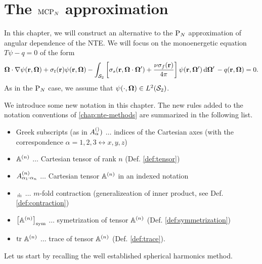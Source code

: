 \ifpdf
	\graphicspath{{4/pic/PNG/}{4/pic/PDF/}{4/pic/}}
\else
	\graphicspath{{4/pic/EPS/}{4/pic/}}
\fi

\chapter{The $\MCPN$ approximation}\label{chap:mcpn}

In this chapter, we will construct an alternative to the $\PN$ approximation of angular dependence of the NTE. We will
focus on the monoenergetic equation $T\psi - q = 0$ of the form
\begin{equation}\label{eq:MC-bte}
    \bomega\cdot\nabla\psi(\br,\bomega) + \sigma_t(\br)\psi(\br,\bomega) - \intA[']{\left[\sigma_s(\br,\bomega\cdot\bomega') + 
    \frac{\nu\sigma_f(\br)}{4\pi}\right]\psi(\br,\bomega')} - q(\br,\bomega) = 0.
\end{equation}
As in the $\PN$ case, we assume that \mbox{$\psi(\cdot,\bomega)\in\Lp[2](\Sphere)$}.

We introduce some new notation in this chapter. The new rules added to the notation conventions of
\cref{chap:nte-methods} are summarized in the following list.

\begin{itemize}
    \item Greek subscripts (as in $\AAA[]{\alpha})$ $\ldots$ indices of the Cartesian axes (with the
    correspondence $\alpha = 1,2,3 \leftrightarrow x,y,z$)
    \item $\AA$ $\ldots$ Cartesian tensor of rank $n$ (Def. \ref{def:tensor})
  	\item $\AAA{\alpha_1\cdot\alpha_n}$ $\ldots$ Cartesian tensor $\AA$ in an indexed notation
    \item $\underset{m}{\cdot}$ $\ldots$ $m$-fold contraction (generalizeation of inner product, see Def.
    \ref{def:contraction})
    \item $\Sym{\AA}$ $\ldots$ symetrization of tensor $\AA$ (Def. \ref{def:symmetrization})
    \item $\trace \AA$ $\ldots$ trace of tensor $\AA$ (Def. \ref{def:trace}).
\end{itemize}

Let us start by recalling the well established spherical harmonics method.

